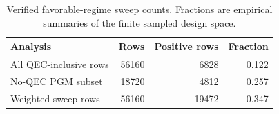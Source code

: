 \begin{table}[htbp]
\centering
\caption{Verified favorable-regime sweep counts. Fractions are empirical summaries of the finite sampled design space.}\label{tab:supp-favorable-counts}
\begin{tabular}{lrrr}
\toprule
Analysis & Rows & Positive rows & Fraction\\
\midrule
All QEC-inclusive rows & 56160 & 6828 & 0.122\\
No-QEC PGM subset & 18720 & 4812 & 0.257\\
Weighted sweep rows & 56160 & 19472 & 0.347\\
\bottomrule
\end{tabular}
\end{table}
